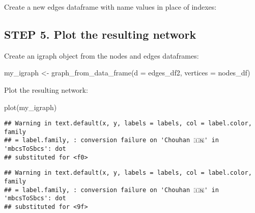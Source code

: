 \documentclass[
]{article}
\newenvironment{Shaded}{\begin{snugshade}}{\end{snugshade}}
\newcommand{\AttributeTok}[1]{\textcolor[rgb]{0.77,0.63,0.00}{#1}}
\newcommand{\FunctionTok}[1]{\textcolor[rgb]{0.00,0.00,0.00}{#1}}
\newcommand{\NormalTok}[1]{#1}
\newcommand{\OtherTok}[1]{\textcolor[rgb]{0.56,0.35,0.01}{#1}}
\newcommand{\SpecialCharTok}[1]{\textcolor[rgb]{0.00,0.00,0.00}{#1}}
\begin{document}
Create a new edges dataframe with name values in place of indexes:

\begin{Shaded}
\end{Shaded}

\hypertarget{step-5.-plot-the-resulting-network}{%
\subsection{STEP 5. Plot the resulting
network}\label{step-5.-plot-the-resulting-network}}

Create an igraph object from the nodes and edges dataframes:

\begin{Shaded}
\begin{Highlighting}[]
\NormalTok{my\_igraph }\OtherTok{\textless{}{-}} \FunctionTok{graph\_from\_data\_frame}\NormalTok{(}\AttributeTok{d =}\NormalTok{ edges\_df2, }\AttributeTok{vertices =}\NormalTok{ nodes\_df)}
\end{Highlighting}
\end{Shaded}

Plot the resulting network:

\begin{Shaded}
\begin{Highlighting}[]
\FunctionTok{plot}\NormalTok{(my\_igraph)}
\end{Highlighting}
\end{Shaded}

\begin{verbatim}
## Warning in text.default(x, y, labels = labels, col = label.color, family
## = label.family, : conversion failure on 'Chouhan 🇮🇳' in 'mbcsToSbcs': dot
## substituted for <f0>
\end{verbatim}

\begin{verbatim}
## Warning in text.default(x, y, labels = labels, col = label.color, family
## = label.family, : conversion failure on 'Chouhan 🇮🇳' in 'mbcsToSbcs': dot
## substituted for <9f>
\end{verbatim}
\end{document}
